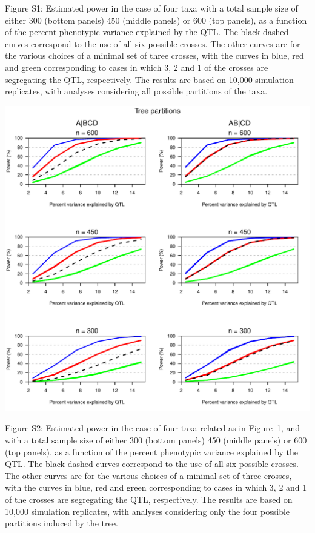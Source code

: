 \documentclass[letterpaper,twoside]{article}
\begin{document}
\bigskip \noindent
Figure S1: Estimated power in the case of four taxa with a total
  sample size of either 300 (bottom panels) 450 (middle panels) or 600
  (top panels), as a function of the percent phenotypic variance
  explained by the QTL.  The black dashed curves correspond to the use
  of all six possible crosses.  The other curves are for the various
  choices of a minimal set of three crosses, with the curves in blue,
  red and green corresponding to cases in which 3, 2 and 1 of the
  crosses are segregating the QTL, respectively.  The results are
  based on 10,000 simulation replicates, with analyses considering all
  possible partitions of the taxa.

\newpage


{\centering
\includegraphics{SuppFigs/power_treepart.pdf}}

\bigskip \noindent
Figure S2: Estimated power in the case of four taxa related as in
  Figure~1, and with a total sample size of either 300 (bottom panels)
  450 (middle panels) or 600 (top panels), as a function of the
  percent phenotypic variance explained by the QTL.  The black dashed
  curves correspond to the use of all six possible crosses.  The other
  curves are for the various choices of a minimal set of three
  crosses, with the curves in blue, red and green corresponding to
  cases in which 3, 2 and 1 of the crosses are segregating the QTL,
  respectively.  The results are based on 10,000 simulation
  replicates, with analyses considering only the four possible
  partitions induced by the tree.
\end{document}
